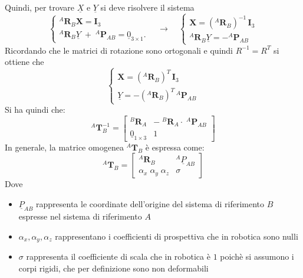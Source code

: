 \documentclass[11pt, a4paper]{report}
\begin{document}
Quindi, per trovare $\underline{X}$ e $\underline{Y}$ si deve risolvere il sistema
\[
    \begin{cases}
        {}^{A}\mathbf{R}_{B}\boldsymbol{X} = \mathbf{I}_{3} \\
        {}^{A}\mathbf{R}_{B}\underline{Y} \; + \; {}^{A}\mathbf{P}_{AB} = \underline{0}_{3 \times 1}.
    \end{cases}
    \quad\longrightarrow\quad
    \begin{cases}
        \boldsymbol{X} = ({}^{A}\mathbf{R}_{B})^{-1}\,\mathbf{I}_{3} \\
        {}^{A}\mathbf{R}_{B}\underline{Y} = -{}^{A}\mathbf{P}_{AB}
    \end{cases}
\]
Ricordando che le matrici di rotazione sono ortogonali e quindi $R^{-1} = R^{T}$ si ottiene che
\[
    \begin{cases}
        \boldsymbol{X} = ({}^{A}\mathbf{R}_{B})^{T}\,\mathbf{I}_{3} \\
        \underline{Y} = - ({}^{A}\mathbf{R}_{B})^{T}\,{}^{A}\mathbf{P}_{AB}
    \end{cases}
\]
Si ha quindi che:
\[
    ^{A}\mathbf{T}_{B}^{-1} =
    \begin{bmatrix}
        ^{B}\mathbf{R}_{A} & - \; ^{B}\mathbf{R}_{A} \cdot \; ^{A}\mathbf{P}_{AB} \\
        \underline{0}_{1 \times 3} & 1
    \end{bmatrix}
\]
In generale, la matrice omogenea $ ^{A}\mathbf{T}_{B}$ è espressa come:
\[
    ^{A}\mathbf{T}_{B} =
    \begin{bmatrix}
    ^{A}\mathbf{R}_{B} & ^{A}\underline{P}_{AB} \\
    \alpha_{x} \; \alpha_{y} \; \alpha_{z} & \sigma
    \end{bmatrix}
\]
Dove
\begin{itemize}
    \item \( \underline{P}_{AB} \) rappresenta le coordinate dell'origine del sistema di riferimento $B$ espresse nel sistema di riferimento $A$
    \item $ \alpha_{x}, \alpha_{y}, \alpha_{z} $ rappresentano i coefficienti di prospettiva che in robotica sono nulli
    \item $ \sigma $ rappresenta il coefficiente di scala che in robotica è $ 1 $ poichè si assumono i corpi rigidi, che per definizione sono non deformabili
\end{itemize}
\end{document}
